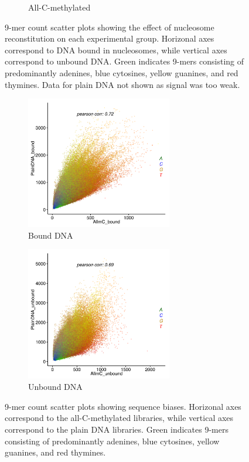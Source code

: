 \documentclass[parskip=full, numbers=noenddot]{scrreprt}
\begin{document}
\begin{figure}[htpb]
\begin{subfigure}[htpb]{0.7\textwidth}
    \caption{All-C-methylated}
    \label{fig:kmer_bound_all}
  \end{subfigure}
  \caption{9-mer count scatter plots showing the effect of nucleosome reconstitution on each experimental group.  Horizonal axes correspond to DNA bound in nucleosomes, while vertical axes correspond to unbound DNA.  Green indicates 9-mers consisting of predominantly adenines, blue cytosines, yellow guanines, and red thymines.  Data for plain DNA not shown as signal was too weak.}
  \label{fig:kmer_bound}
\end{figure}

\begin{figure}[htpb]
  \centering
  \begin{subfigure}[htpb]{0.7\textwidth}
    \centering
    \includegraphics[width=0.7\textwidth]{kmer_plainbXallb}
    \caption{Bound DNA}
    \label{fig:kmer_bias_bound}
  \end{subfigure}
  \begin{subfigure}[htpb]{0.7\textwidth}
    \centering
    \includegraphics[width=0.7\textwidth]{kmer_plainubXallub}
    \caption{Unbound DNA}
    \label{fig:kmer_bias_unbound}
  \end{subfigure}
  \caption{9-mer count scatter plots showing sequence biases.  Horizonal axes correspond to the all-C-methylated libraries, while vertical axes correspond to the plain DNA libraries.  Green indicates 9-mers consisting of predominantly adenines, blue cytosines, yellow guanines, and red thymines.}
  \label{fig:kmer_bias}
\end{figure}
\end{document}
